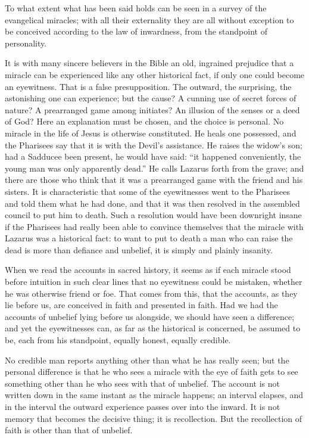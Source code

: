 \documentclass[12pt,a4paper,openany]{book}
\newcommand{\opage}[1]{\marginnote{\footnotesize\textit{[#1]}}}
\begin{document}
To what extent what has been said holds can be seen in a survey of the evangelical miracles; with all
their externality they are all without exception to be conceived according to the law of inwardness,
from the standpoint of personality.

It is with many sincere believers in the Bible an old, ingrained prejudice that a miracle can be
experienced like any other historical fact, if only one could become an eyewitness. That is a false
presupposition. The outward, the surprising, the astonishing one can experience; but the cause? A
cunning use of secret forces of nature? A prearranged game among initiates? An illusion of the senses
or a deed of God? Here an explanation must be chosen, and the choice is personal. No miracle in the
life of Jesus is otherwise constituted. He heals one possessed, and the Pharisees say that it is with
the Devil's assistance. He raises the widow's son; had a Sadducee been present, he would have said:
``it happened conveniently, the young man was only apparently dead.'' He calls Lazarus forth from the
grave; and there are those
\setcounter{footnote}{0}%
\opage{77}who think that it was a prearranged game with the friend and his sisters. It is
characteristic that some of the eyewitnesses went to the Pharisees and told them what he had done, and
that it was then resolved in the assembled council to put him to death. Such a resolution would have
been downright insane if the Pharisees had really been able to convince themselves that the miracle
with Lazarus was a historical fact: to want to put to death a man who can raise the dead is more than
defiance and unbelief, it is simply and plainly insanity.

When we read the accounts in sacred history, it seems as if each miracle stood before intuition in
such clear lines that no eyewitness could be mistaken, whether he was otherwise friend or foe. That
comes from this, that the accounts, as they lie before us, are conceived in faith and presented in
faith. Had we had the accounts of unbelief lying before us alongside, we should have seen a difference;
and yet the eyewitnesses can, as far as the historical is concerned, be assumed to be, each from his
standpoint, equally honest, equally credible.

No credible man reports anything other than what he has really seen; but the personal difference is
that he who sees a miracle with the eye of faith gets to see something other than he who sees with that
of unbelief. The account is not written down in the same instant as the miracle happens; an interval
elapses, and in the interval the outward experience passes over into the inward. It is not memory that
becomes the decisive thing; it is recollection. But the recollection of faith is other than that of
unbelief.
\end{document}
